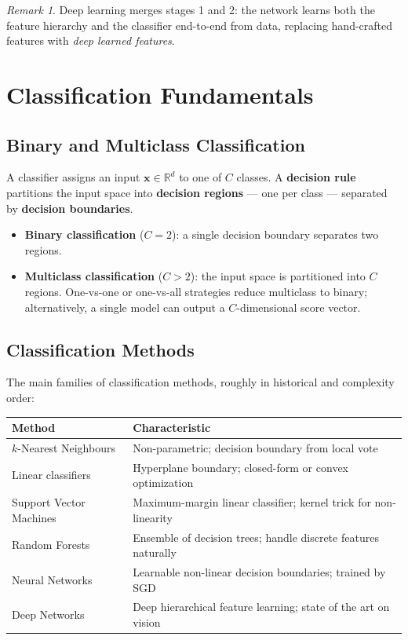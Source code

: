 \documentclass[11pt,a4paper]{article}
\theoremstyle{definition}
\theoremstyle{plain}
\theoremstyle{remark}
\newtheorem*{remark}{Remark}
\begin{document}
\begin{remark}
Deep learning merges stages 1 and 2: the network learns both the feature hierarchy and the classifier end-to-end from data, replacing hand-crafted features with \emph{deep learned features}.
\end{remark}


\section{Classification Fundamentals}

\subsection{Binary and Multiclass Classification}

A classifier assigns an input $\mathbf{x} \in \mathbb{R}^d$ to one of $C$ classes.
A \textbf{decision rule} partitions the input space into \textbf{decision regions} --- one per class --- separated by \textbf{decision boundaries}.

\begin{itemize}
    \item \textbf{Binary classification} ($C=2$): a single decision boundary separates two regions.
    \item \textbf{Multiclass classification} ($C > 2$): the input space is partitioned into $C$ regions. One-vs-one or one-vs-all strategies reduce multiclass to binary; alternatively, a single model can output a $C$-dimensional score vector.
\end{itemize}

\subsection{Classification Methods}

The main families of classification methods, roughly in historical and complexity order:

\begin{center}
\begin{tabular}{ll}
    \hline
    \textbf{Method} & \textbf{Characteristic} \\
    \hline
    $k$-Nearest Neighbours & Non-parametric; decision boundary from local vote \\
    Linear classifiers    & Hyperplane boundary; closed-form or convex optimization \\
    Support Vector Machines & Maximum-margin linear classifier; kernel trick for non-linearity \\
    Random Forests        & Ensemble of decision trees; handle discrete features naturally \\
    Neural Networks       & Learnable non-linear decision boundaries; trained by SGD \\
    Deep Networks         & Deep hierarchical feature learning; state of the art on vision \\
    \hline
\end{tabular}
\end{center}
\end{document}
